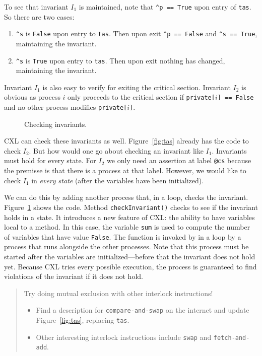 \documentclass{report}
\newenvironment{code}{
\tcolorbox
}{
\endtcolorbox
}
\begin{document}
To see that invariant $I_1$ is maintained, note that
\texttt{\^{}p == True} upon entry of \texttt{tas}.
So there are two cases:
\begin{enumerate}
\item \texttt{\^{}s} is \texttt{False} upon entry to \texttt{tas}.
Then upon exit \texttt{\^{}p == False} and \texttt{\^{}s == True}, maintaining
the invariant.
\item \texttt{\^{}s} is \texttt{True} upon entry to \texttt{tas}.
Then upon exit nothing has changed, maintaining the invariant.
\end{enumerate}
Invariant $I_1$ is also easy to verify for exiting the critical section.
Invariant $I_2$ is obvious as process $i$ only proceeds to the critical
section if \texttt{private[$i$] == False} and no other process modifies
\texttt{private[$i$]}.

\begin{figure}
\begin{code}

\end{code}
\caption{Checking invariants.}
\label{fig:tasinv}
\end{figure}

CXL can check these invariants as well.  Figure~\ref{fig:tas} already
has the code to check $I_2$.  But how would one go about checking an
invariant like $I_1$.  Invariants must hold for every state.
For $I_2$ we only need an assertion at label \texttt{@cs} because the
premisse is that there is a process at that label.  However, we would
like to check $I_1$ in \emph{every state} (after the variables have
been initialized).

We can do this by adding another process that, in a loop,
checks the invariant.  Figure~\ref{fig:tasinv} shows the code.
Method \texttt{checkInvariant()} checks to see if the invariant holds
in a state.  It introduces a new feature of CXL: the ability to have
variables local to a method.  In this case, the variable \texttt{sum}
is used to compute the number of variables that have value
\texttt{False}.
The function is invoked by in a loop by a process that runs alongside
the other processes.
Note that this process must be started after the variables are
initialized---before that the invariant does not hold yet.
Because CXL tries every possible execution, the process is guaranteed
to find violations of the invariant if it does not hold.

\begin{quote}
Try doing mutual exclusion with other interlock instructions!
\begin{itemize}
\item Find a description for \texttt{compare-and-swap} on the internet and
update Figure~\ref{fig:tas}, replacing \texttt{tas}.
\item Other interesting interlock instructions include \texttt{swap} and
\texttt{fetch-and-add}.
\end{itemize}
\end{quote}
\end{document}
